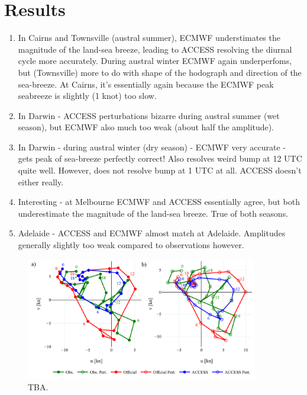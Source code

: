 \documentclass[10pt]{article}
\begin{document}
\section{Results}
\begin{enumerate}
\item
In Cairns and Townsville (austral summer), ECMWF understimates the magnitude of the land-sea breeze, leading to ACCESS resolving the diurnal cycle more accurately. During austral winter ECMWF again underperfoms, but (Townsville) more to do with shape of the hodograph and direction of the sea-breeze. At Cairns, it's essentially again because the ECMWF peak seabreeze is slightly (1 knot) too slow.   
\item
In Darwin - ACCESS perturbations bizarre during austral summer (wet season), but ECMWF also much too weak (about half the amplitude). 
\item
In Darwin - during austral winter (dry season) - ECMWF very accurate - gets peak of sea-breeze perfectly correct! Also resolves weird bump at 12 UTC quite well. However, does not resolve bump at 1 UTC at all. ACCESS doesn't either really. 
\item
Interesting - at Melbourne ECMWF and ACCESS essentially agree, but both underestimate the magnitude of the land-sea breeze. True of both seasons. 
\item
Adelaide - ACCESS and ECMWF almost match at Adelaide. Amplitudes generally slightly too weak compared to observations however. 
\end{enumerate}

\begin{figure}
\centering
\includegraphics[width=0.90\textwidth]{daily_winds_darwin_AP.pdf}
\caption{TBA.}
\label{Fig:airport_wpi_access}
\end{figure}
\end{document}
